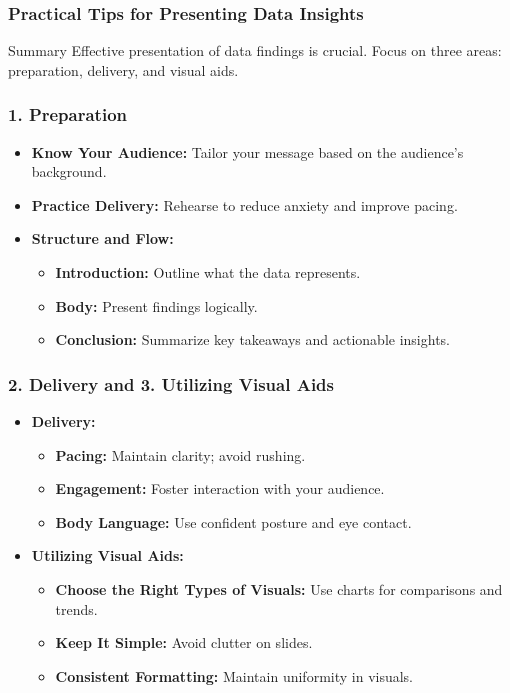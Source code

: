 \documentclass[aspectratio=169]{beamer}
\begin{document}
\begin{frame}[fragile]
    \frametitle{Practical Tips for Presenting Data Insights}
    \begin{block}{Summary}
        Effective presentation of data findings is crucial. Focus on three areas: 
        preparation, delivery, and visual aids.
    \end{block}
\end{frame}

\begin{frame}[fragile]
    \frametitle{1. Preparation}
    \begin{itemize}
        \item \textbf{Know Your Audience:} Tailor your message based on the audience's background.
        \item \textbf{Practice Delivery:} Rehearse to reduce anxiety and improve pacing.
        \item \textbf{Structure and Flow:}
        \begin{itemize}
            \item \textbf{Introduction:} Outline what the data represents.
            \item \textbf{Body:} Present findings logically.
            \item \textbf{Conclusion:} Summarize key takeaways and actionable insights.
        \end{itemize}
    \end{itemize}
\end{frame}

\begin{frame}[fragile]
    \frametitle{2. Delivery and 3. Utilizing Visual Aids}
    \begin{itemize}
        \item \textbf{Delivery:}
        \begin{itemize}
            \item \textbf{Pacing:} Maintain clarity; avoid rushing.
            \item \textbf{Engagement:} Foster interaction with your audience.
            \item \textbf{Body Language:} Use confident posture and eye contact.
        \end{itemize}
        \item \textbf{Utilizing Visual Aids:}
        \begin{itemize}
            \item \textbf{Choose the Right Types of Visuals:} Use charts for comparisons and trends.
            \item \textbf{Keep It Simple:} Avoid clutter on slides.
            \item \textbf{Consistent Formatting:} Maintain uniformity in visuals.
        \end{itemize}
    \end{itemize}
\end{frame}
\end{document}
